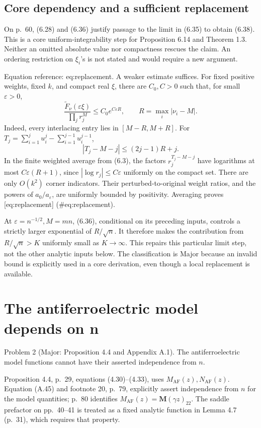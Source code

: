 \documentclass[10pt]{article}
\begin{document}
\subsection*{Core dependency and a sufficient replacement}
On p. 60, (6.28) and (6.36) justify passage to the limit in (6.35) to obtain (6.38). This is a core uniform-integrability step for Proposition 6.14 and Theorem 1.3. Neither an omitted absolute value nor compactness rescues the claim. An ordering restriction on \(\xi_i\)’s is not stated and would require a new argument.\par
Equation reference: eq:replacement. A weaker estimate suffices. For fixed positive weights, fixed \(k\), and compact real \(\xi\), there are \(C_0,C>0\) such that, for small \(\varepsilon>0\), \[
 \frac{\widetilde F_\nu(\varepsilon\xi)}{\prod_j r_j^M}
 \le C_0e^{C\varepsilon R},\qquad R=\max_i|\nu_i-M|.\] Indeed, every interlacing entry lies in \([M-R,M+R]\). For \(T_j=\sum_{i=1}^j u_i^j-\sum_{i=1}^{j-1}u_i^{j-1}\), \[|T_j-M-j|\le(2j-1)R+j.\] In the finite weighted average from (6.3), the factors \(r_j^{T_j-M-j}\) have logarithms at most \(C\varepsilon(R+1)\), since \(|\log r_j|\le C\varepsilon\) uniformly on the compact set. There are only \(O(k^2)\) corner indicators. Their perturbed-to-original weight ratios, and the powers of \(a_0/a_\varepsilon\), are uniformly bounded by positivity. Averaging proves [eq:replacement] (\#eq:replacement).\par
At \(\varepsilon=n^{-1/2},M=mn\), (6.36), conditional on its preceding inputs, controls a strictly larger exponential of \(R/\sqrt n\). It therefore makes the contribution from \(R/\sqrt n>K\) uniformly small as \(K\to\infty\). This repairs this particular limit step, not the other analytic inputs below. The classification is Major because an invalid bound is explicitly used in a core derivation, even though a local replacement is available.\par
\section*{The antiferroelectric model depends on n}
Problem 2 (Major: Proposition 4.4 and Appendix A.1).  The antiferroelectric model functions cannot have their asserted independence from \(n\).\par
Proposition 4.4, p. 29, equations (4.30)–(4.33), uses \(M_{\mathrm{AF}}(z),N_{\mathrm{AF}}(z)\). Equation (A.45) and footnote 20, p. 79, explicitly assert independence from \(n\) for the model quantities; p. 80 identifies \(M_{\mathrm{AF}}(z)=\mathbf M(\gamma z)_{22}\). The saddle prefactor on pp. 40–41 is treated as a fixed analytic function in Lemma 4.7 (p. 31), which requires that property.\par
\end{document}
